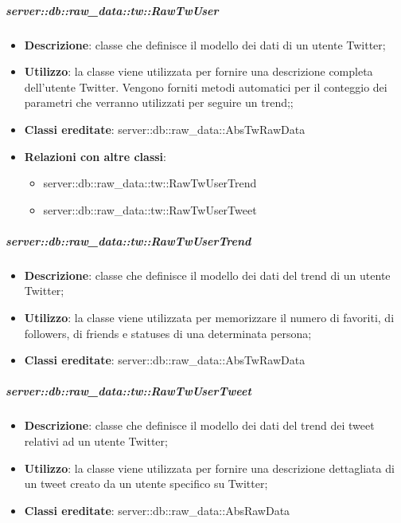 		\subparagraph{server::db::raw\_data::tw::RawTwUser} %
		\label{subp:server_db_raw_data_tw_rawtwuser}
			\begin{itemize}
				\item \textbf{Descrizione}: classe che definisce il modello dei dati di un utente Twitter;
				\item \textbf{Utilizzo}: la classe viene utilizzata per fornire una descrizione completa dell'utente Twitter. Vengono forniti metodi automatici per il conteggio dei parametri che verranno utilizzati per seguire un trend;;
				\item \textbf{Classi ereditate}: server::db::raw\_data::AbsTwRawData
				\item \textbf{Relazioni con altre classi}:
					\begin{itemize}
						\item server::db::raw\_data::tw::RawTwUserTrend
						\item server::db::raw\_data::tw::RawTwUserTweet
					\end{itemize}
			\end{itemize}


		\subparagraph{server::db::raw\_data::tw::RawTwUserTrend} %
		\label{subp:server_db_raw_data_tw_rawigusertrend}
			\begin{itemize}
				\item \textbf{Descrizione}: classe che definisce il modello dei dati del trend di un utente Twitter;
				\item \textbf{Utilizzo}: la classe viene utilizzata per memorizzare il numero di favoriti, di followers, di friends e statuses di una determinata persona;
				\item \textbf{Classi ereditate}: server::db::raw\_data::AbsTwRawData
			\end{itemize}


		\subparagraph{server::db::raw\_data::tw::RawTwUserTweet} %
		\label{subp:server_db_raw_data_tw_rawtwusertweet}
			\begin{itemize}
				\item \textbf{Descrizione}: classe che definisce il modello dei dati del trend dei tweet relativi ad un utente Twitter;
				\item \textbf{Utilizzo}: la classe viene utilizzata per fornire una descrizione dettagliata di un tweet creato da un utente specifico su Twitter;
				\item \textbf{Classi ereditate}: server::db::raw\_data::AbsRawData
			\end{itemize}


